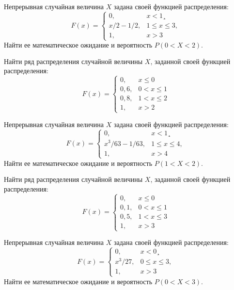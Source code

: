 \vfill

\z Непрерывная случайная величина $X$ задана своей функцией распределения: $$ F(x) = \begin{cases}0, & x < 1¸\\ x/2-1/2, & 1 \leqslant x \leqslant 3, \\ 1, & x > 3 \end{cases} $$ Найти ее математическое ожидание и вероятность $P(0 < X < 2)$.
 

\vfill

\newpage\setcounter{zad}{0}

\z Найти ряд распределения случайной величины $X$, заданной своей функцией распределения: $$ F(x) = \begin{cases}0, & x \leqslant 0 \\ 0{,}6, & 0 < x \leqslant 1 \\ 0{,}8, & 1 < x \leqslant 2 \\ 1, & x > 2 \end{cases} $$


\vfill

\z Непрерывная случайная величина $X$ задана своей функцией распределения: $$ F(x) = \begin{cases}0, & x < 1¸\\ x^3/63-1/63, & 1 \leqslant x \leqslant 4, \\ 1, & x > 4 \end{cases} $$ Найти ее математическое ожидание и вероятность $P(1 < X < 2)$.
 

\vfill

\newpage\setcounter{zad}{0}

\z Найти ряд распределения случайной величины $X$, заданной своей функцией распределения: $$ F(x) = \begin{cases}0, & x \leqslant 0 \\ 0{,}1, & 0 < x \leqslant 1 \\ 0{,}5, & 1 < x \leqslant 3 \\ 1, & x > 3 \end{cases} $$


\vfill

\z Непрерывная случайная величина $X$ задана своей функцией распределения: $$ F(x) = \begin{cases}0, & x < 0¸\\ x^3/27, & 0 \leqslant x \leqslant 3, \\ 1, & x > 3 \end{cases} $$ Найти ее математическое ожидание и вероятность $P(0 < X < 3)$.
 

